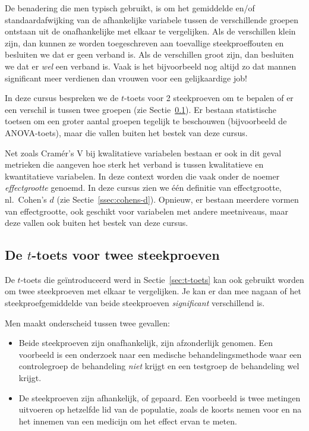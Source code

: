 De benadering die men typisch gebruikt, is om het gemiddelde en/of standaardafwijking van de afhankelijke variabele tussen de verschillende groepen ontstaan uit de onafhankelijke met elkaar te vergelijken. Als de verschillen klein zijn, dan kunnen ze worden toegeschreven aan toevallige steekproeffouten en besluiten we dat er geen verband is. Als de verschillen groot zijn, dan besluiten we dat er \emph{wel} een verband is. Vaak is het bijvoorbeeld nog altijd zo dat mannen significant meer verdienen dan vrouwen voor een gelijkaardige job!

In deze cursus bespreken we de $t$-toets voor 2 steekproeven om te bepalen of er een verschil is tussen twee groepen (zie Sectie~\ref{ssec:t-toets-twee-steekproeven}). Er bestaan statistische toetsen om een groter aantal groepen tegelijk te beschouwen (bijvoorbeeld de ANOVA-toets), maar die vallen buiten het bestek van deze cursus.

Net zoals Cramér's V bij kwalitatieve variabelen bestaan er ook in dit geval metrieken die aangeven hoe sterk het verband is tussen kwalitatieve en kwantitatieve variabelen. In deze context worden die vaak onder de noemer \emph{effectgrootte} genoemd. In deze cursus zien we één definitie van effectgrootte, nl.~Cohen's $d$ (zie Sectie~\ref{ssec:cohens-d}). Opnieuw, er bestaan meerdere vormen van effectgrootte, ook geschikt voor variabelen met andere meetniveaus, maar deze vallen ook buiten het bestek van deze cursus.

\subsection{De \texorpdfstring{$t$}{t}-toets voor twee steekproeven}
\label{ssec:t-toets-twee-steekproeven}

De $t$-toets die geïntroduceerd werd in Sectie~\ref{sec:t-toets} kan ook gebruikt worden om twee steekproeven met elkaar te vergelijken. Je kan er dan mee nagaan of het steekproefgemiddelde van beide steekproeven \emph{significant} verschillend is.

Men maakt onderscheid tussen twee gevallen:

\begin{itemize}
  \item Beide steekproeven zijn onafhankelijk, zijn afzonderlijk genomen. Een voorbeeld is een onderzoek naar een medische behandelingsmethode waar een controlegroep de behandeling \emph{niet} krijgt en een testgroep de behandeling wel krijgt.
  \item De steekproeven zijn afhankelijk, of gepaard. Een voorbeeld is twee metingen uitvoeren op hetzelfde lid van de populatie, zoals de koorts nemen voor en na het innemen van een medicijn om het effect ervan te meten.
\end{itemize}

